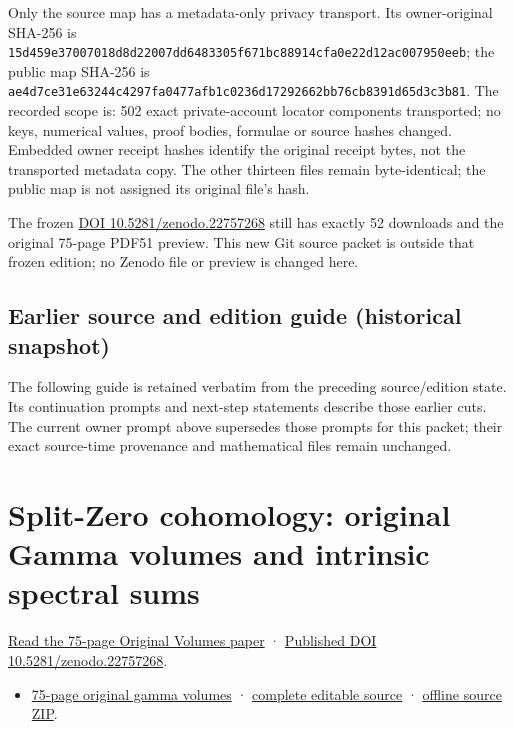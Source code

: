 \documentclass[
]{article}
\providecommand{\tightlist}{%
  \setlength{\itemsep}{0pt}\setlength{\parskip}{0pt}}
\begin{document}
Only the source map has a metadata-only privacy transport. Its
owner-original SHA-256 is
\texttt{15d459e37007018d8d22007dd6483305f671bc88914cfa0e22d12ac007950eeb};
the public map SHA-256 is
\texttt{ae4d7ce31e63244c4297fa0477afb1c0236d17292662bb76cb8391d65d3c3b81}.
The recorded scope is: 502 exact private-account locator components
transported; no keys, numerical values, proof bodies, formulae or source
hashes changed. Embedded owner receipt hashes identify the original
receipt bytes, not the transported metadata copy. The other thirteen
files remain byte-identical; the public map is not assigned its original
file's hash.

The frozen \href{https://doi.org/10.5281/zenodo.22757268}{DOI
10.5281/zenodo.22757268} still has exactly 52 downloads and the original
75-page PDF51 preview. This new Git source packet is outside that frozen
edition; no Zenodo file or preview is changed here.

\subsection{Earlier source and edition guide (historical
snapshot)}\label{earlier-source-and-edition-guide-historical-snapshot-16}

The following guide is retained verbatim from the preceding
source/edition state. Its continuation prompts and next-step statements
describe those earlier cuts. The current owner prompt above supersedes
those prompts for this packet; their exact source-time provenance and
mathematical files remain unchanged.

\section{Split-Zero cohomology: original Gamma volumes and intrinsic
spectral
sums}\label{split-zero-cohomology-original-gamma-volumes-and-intrinsic-spectral-sums}

\href{https://zenodo.org/api/records/22757268/files/51-original-gamma-volumes-reader.pdf/content}{Read
the 75-page Original Volumes paper} ·
\href{https://doi.org/10.5281/zenodo.22757268}{Published DOI
10.5281/zenodo.22757268}.

\begin{itemize}
\tightlist
\item
  \href{https://zenodo.org/api/records/22757268/files/51-original-gamma-volumes-reader.pdf/content}{75-page
  original gamma volumes} ·
  \href{https://github.com/KokunoYumeto/zeta-function-research-reader/tree/1c8ec52c85c173adc9f8403a8a26914955e2f5a9/workbenches/splitzero-tandem/continuations/20260914-original-volumes}{complete
  editable source} ·
  \href{https://zenodo.org/api/records/22757268/files/52-original-gamma-volumes-public-sources.zip/content}{offline
  source ZIP}.
\end{itemize}
\end{document}
